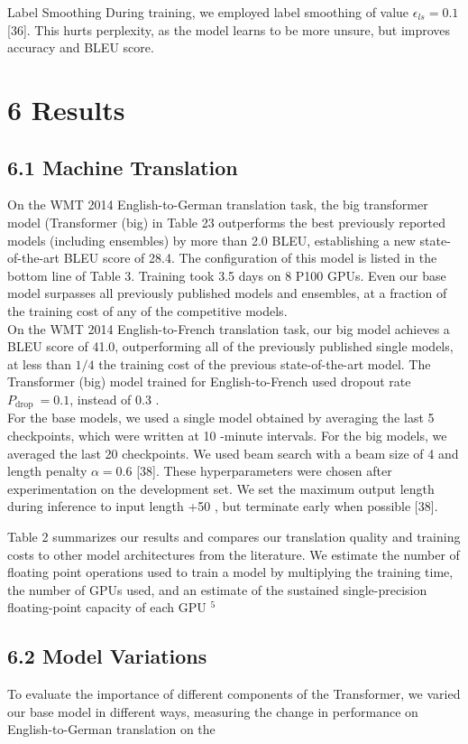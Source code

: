 \documentclass[10pt]{article}
\begin{document}
Label Smoothing During training, we employed label smoothing of value $\epsilon_{l s}=0.1$ [36]. This hurts perplexity, as the model learns to be more unsure, but improves accuracy and BLEU score.

\section*{6 Results}
\subsection*{6.1 Machine Translation}
On the WMT 2014 English-to-German translation task, the big transformer model (Transformer (big) in Table 23 outperforms the best previously reported models (including ensembles) by more than 2.0 BLEU, establishing a new state-of-the-art BLEU score of 28.4. The configuration of this model is listed in the bottom line of Table 3. Training took 3.5 days on 8 P100 GPUs. Even our base model surpasses all previously published models and ensembles, at a fraction of the training cost of any of the competitive models.\\
On the WMT 2014 English-to-French translation task, our big model achieves a BLEU score of 41.0, outperforming all of the previously published single models, at less than $1 / 4$ the training cost of the previous state-of-the-art model. The Transformer (big) model trained for English-to-French used dropout rate $P_{\text {drop }}=0.1$, instead of 0.3 .\\
For the base models, we used a single model obtained by averaging the last 5 checkpoints, which were written at 10 -minute intervals. For the big models, we averaged the last 20 checkpoints. We used beam search with a beam size of 4 and length penalty $\alpha=0.6$ [38]. These hyperparameters were chosen after experimentation on the development set. We set the maximum output length during inference to input length +50 , but terminate early when possible [38].

Table 2 summarizes our results and compares our translation quality and training costs to other model architectures from the literature. We estimate the number of floating point operations used to train a model by multiplying the training time, the number of GPUs used, and an estimate of the sustained single-precision floating-point capacity of each GPU ${ }^{5}$

\subsection*{6.2 Model Variations}
To evaluate the importance of different components of the Transformer, we varied our base model in different ways, measuring the change in performance on English-to-German translation on the
\end{document}
